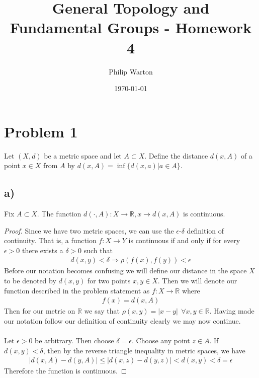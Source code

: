 \documentclass{article}
\theoremstyle{definition}
\begin{document}
\title{General Topology and Fundamental Groups - Homework 4}
\author{Philip Warton}
\date{\today}
\maketitle
\section*{Problem 1}
    Let $(X,d)$ be a metric space and let $A \subset X$.
    Define the distance $d(x,A)$ of a point $x \in X$ from $A$
    by $d(x,A) = \inf\{d(x,a)|a \in A\}$.
    \subsection*{a)}
        \begin{mdframed}
            Fix $A \subset X$. The function $d(\cdot , A): X 
            \rightarrow \mathbb{R}, x \rightarrow d(x,A)$ is
            continuous.
        \end{mdframed}
        \begin{proof}
            Since we have two metric spaces, we can use the $\epsilon$-$\delta$ definition
            of continuity. That is, a function $f:X \rightarrow Y$ is continuous if and only
            if for every $\epsilon > 0$ there exists a $\delta > 0$ such that 
            \begin{align}
                d(x,y) < \delta \Longrightarrow \rho(f(x), f(y)) < \epsilon
            \end{align}
            Before our notation becomes confusing we will define our distance in the space $X$
            to be denoted by $d(x,y)$ for two points $x,y \in X$. Then we will denote our function
            described in the problem statement as $f: X \rightarrow \mathbb{R}$ where 
            \begin{align}
                f(x) = d(x,A)
            \end{align}
            Then for our metric on $\mathbb{R}$ we say that $\rho(x,y) = |x - y| \ \ \forall x,y \in
            \mathbb{R}$.
            Having made our notation follow our definition of continuity clearly we may now continue. \\\\
            Let $\epsilon > 0$ be arbitrary. Then choose $\delta = \epsilon$. Choose any point $z \in A$. 
            If $d(x,y) < \delta$, then by the reverse triangle inequality in metric spaces, we have
            \begin{align}
                |d(x,A) - d(y,A)| \leqslant |d(x,z) - d(y,z)| < d(x,y) < \delta = \epsilon
            \end{align}
            Therefore the function is continuous.
        \end{proof}
\end{document}
